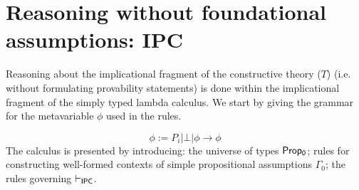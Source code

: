 \documentclass[11pt]{eptcs} %
\newcommand{\Turn}[2]
	{ {#1}\vdash_{\textbf{\sf IPC}}  {#2}}
\begin{document}
\section{Reasoning without foundational assumptions: {\sf IPC}}\label{sec:IPC}

Reasoning about the implicational fragment of the constructive theory ($T$) (i.e. without formulating provability statements) is done within the implicational fragment of the simply typed lambda calculus. We start by giving the grammar for the metavariable $\phi$ used in the rules.

\begin{displaymath}
\phi:= P_i | \bot | \phi \rightarrow \phi
\end{displaymath}
%
The calculus is presented by introducing: the universe of types {$\sf Prop_0$}; rules for constructing well-formed contexts of simple propositional assumptions $\Gamma_0$; the rules governing $\vdash_{{\sf IPC}}$.






\end{document}
